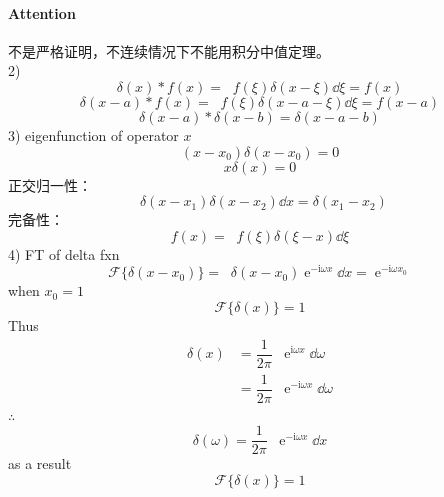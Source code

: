 \documentclass[UTF8]{ctexart} %
\DeclareMathOperator{\intdinf}{\int_{-\infty}^\infty}
\DeclareMathOperator{\e}{\mathrm{e}}
\renewcommand{\I}{\mathrm{i}}
\numberwithin{equation}{section}
\begin{document}
\paragraph{Attention} 不是严格证明，不连续情况下不能用积分中值定理。\\
2) \\
\begin{equation}\label{key}
\delta(x)*f(x)=\intdinf f(\xi)\delta(x-\xi)\dd\xi=f(x)
\end{equation}
\begin{equation}\label{key}
\delta(x-a)*f(x)=\intdinf f(\xi)\delta(x-a-\xi)\dd\xi=f(x-a)
\end{equation}
\begin{equation}\label{key}
\delta(x-a)*\delta(x-b)=\delta(x-a-b)
\end{equation}
3) eigenfunction of operator $x$\\
\begin{equation}\label{key}
(x-x_0)\delta(x-x_0)=0
\end{equation}
\begin{equation}\label{key}
x\delta(x)=0
\end{equation}
正交归一性：
\begin{equation}\label{key}
\intdinf\delta(x-x_1)\delta(x-x_2)\dd{x}=\delta(x_1-x_2)
\end{equation}
完备性：
\begin{equation}\label{key}
f(x)=\intdinf f(\xi)\delta(\xi-x)\dd\xi
\end{equation}
4) FT of delta fxn\\
\begin{equation}\label{key}
\mathcal{F}\{\delta(x-x_0)\}=\intdinf\delta(x-x_0)\e^{-\I\omega x}\dd{x}=\e^{-\I\omega x_0}
\end{equation}
when $x_0=1$
\begin{equation}\label{key}
\mathcal{F}\{\delta(x)\}=1
\end{equation}
Thus
\begin{equation}\label{1}
\begin{aligned}
\delta(x)&=\dfrac{1}{2\pi}\intdinf\e^{\I\omega x}\dd\omega\\
&=\dfrac{1}{2\pi}\intdinf\e^{-\I\omega x}\dd\omega
\end{aligned}
\end{equation}
$\therefore$
\begin{equation}\label{key}
\delta(\omega)=\dfrac{1}{2\pi}\intdinf\e^{-\I\omega x}\dd x
\end{equation}
as a result
\begin{equation}\label{key}
\mathcal{F}\{\delta(x)\}=1
\end{equation}
\end{document}
